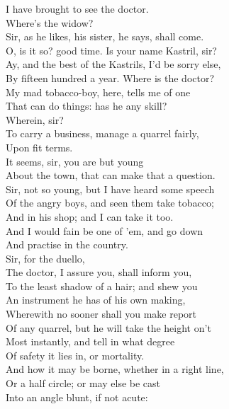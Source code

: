 \documentclass[a4paper,oneside]{memoir}
\begin{document}
\begin{drama*}
I have brought to see the doctor.\\
\facespeaks {} Where's the widow?\\
\druggerspeaks Sir, as he likes, his sister, he says, shall come.\\
\facespeaks O, is it so? good time. Is your name Kastril, sir?\\
\kastrilspeaks Ay, and the best of the Kastrils, I'd be sorry else,\\
By fifteen hundred a year. Where is the doctor?\\
My mad tobacco-boy, here, tells me of one\\
That can do things: has he any skill?\\
\facespeaks {} Wherein, sir?\\
\kastrilspeaks To carry a business, manage a quarrel fairly,\\
Upon fit terms.\\
\facespeaks {} It seems, sir, you are but young\\
About the town, that can make that a question.\\
\kastrilspeaks Sir, not so young, but I have heard some speech\\
Of the angry boys, and seen them take tobacco;\\
And in his shop; and I can take it too.\\
And I would fain be one of 'em, and go down\\
And practise in the country.\\
\facespeaks {} Sir, for the duello,\\
The doctor, I assure you, shall inform you,\\
To the least shadow of a hair; and shew you\\
An instrument he has of his own making,\\
Wherewith no sooner shall you make report\\
Of any quarrel, but he will take the height on't\\
Most instantly, and tell in what degree\\
Of safety it lies in, or mortality.\\
And how it may be borne, whether in a right line,\\
Or a half circle; or may else be cast\\
Into an angle blunt, if not acute:\\

\end{drama*}
\end{document}
